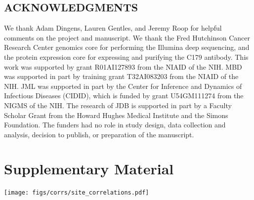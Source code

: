 \documentclass[11pt]{article}
\begin{document}
\subsection*{ACKNOWLEDGMENTS}
We thank Adam Dingens, Lauren Gentles, and Jeremy Roop for helpful comments on the project and manuscript.
We thank the Fred Hutchinson Cancer Research Center genomics core for performing the Illumina deep sequencing, and the protein expression core for expressing and purifying the C179 antibody.
This work was supported by grant R01AI127893 from the NIAID of the NIH.
MBD was supported in part by training grant T32AI083203 from the NIAID of the NIH.
JML was supported in part by the Center for Inference and Dynamics of Infectious Diseases (CIDID), which is funded by grant U54GM111274 from the NIGMS of the NIH.
The research of JDB is supported in part by a Faculty Scholar Grant from the Howard Hughes Medical Institute and the Simons Foundation.
The funders had no role in study design, data collection and analysis, decision to publish, or preparation of the manuscript.




\clearpage
\normalsize

\section*{Supplementary Material}
\FloatBarrier
{}%
\renewcommand*{\thepage}{S\arabic{page}}

\begin{suppfigure}
\centerline{\texttt{[image: figs/corrs/site\_correlations.pdf]}}
\caption{\label{suppfig:corr}
{\bf Correlations across experimental replicates.} 
Each point represents one site in HA, and gives the fraction surviving above average across all amino-acid mutations at that site, as calculated using Equation~\ref{eq:avgfracsurvive}.
The replicates are highly correlated for antibodies with strong escape mutations (S139/1, H17-L19, H17-L10, and H17-L7), and reasonably correlated for antibodies with only weak escape mutations (FI6v3 and C179).
}
\end{suppfigure}
\end{document}
